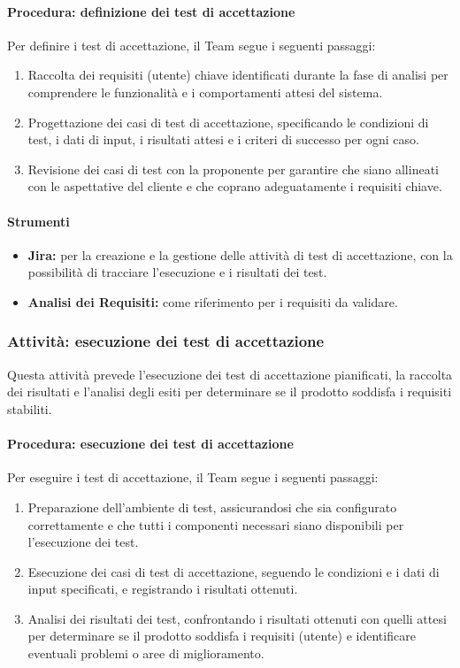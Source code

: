 \documentclass[a4paper,12pt]{article}
\begin{document}
\paragraph{Procedura: definizione dei test di accettazione}
Per definire i test di accettazione, il Team segue i seguenti passaggi:
\begin{enumerate}
    \item Raccolta dei requisiti (utente) chiave identificati durante la fase di analisi per
          comprendere le funzionalità e i comportamenti attesi del sistema.
    \item Progettazione dei casi di test di accettazione, specificando le condizioni di
          test, i dati di input, i risultati attesi e i criteri di successo per ogni
          caso.
    \item Revisione dei casi di test con la proponente per garantire che siano allineati
          con le aspettative del cliente e che coprano adeguatamente i requisiti chiave.
\end{enumerate}

\paragraph{Strumenti}
\begin{itemize}
    \item \textbf{Jira:} per la creazione e la gestione delle attività di test di accettazione, con la possibilità di tracciare l'esecuzione e i risultati dei test.
    \item \textbf{Analisi dei Requisiti:} come riferimento per i requisiti da validare.
\end{itemize}

\subsubsection{Attività: esecuzione dei test di accettazione}
Questa attività prevede l'esecuzione dei test di accettazione pianificati, la
raccolta dei risultati e l'analisi degli esiti per determinare se il prodotto
soddisfa i requisiti stabiliti.

\paragraph{Procedura: esecuzione dei test di accettazione}
Per eseguire i test di accettazione, il Team segue i seguenti passaggi:
\begin{enumerate}
    \item Preparazione dell'ambiente di test, assicurandosi che sia configurato
          correttamente e che tutti i componenti necessari siano disponibili per
          l'esecuzione dei test.
    \item Esecuzione dei casi di test di accettazione, seguendo le condizioni e i dati di
          input specificati, e registrando i risultati ottenuti.
    \item Analisi dei risultati dei test, confrontando i risultati ottenuti con quelli
          attesi per determinare se il prodotto soddisfa i requisiti (utente) e identificare
          eventuali problemi o aree di miglioramento.
\end{enumerate}
\end{document}
